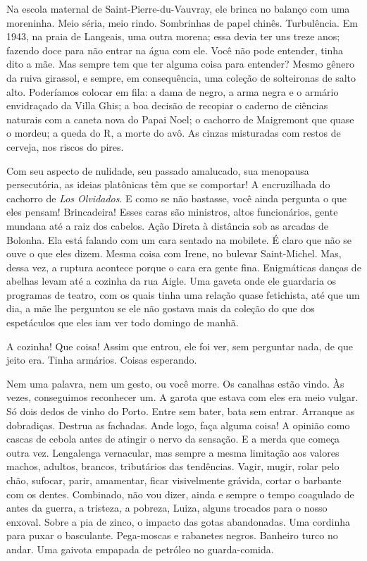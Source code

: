 Na escola maternal de Saint-Pierre-du-Vauvray, ele brinca no balanço com
uma moreninha. Meio séria, meio rindo. Sombrinhas de papel chinês.
Turbulência. Em 1943, na praia de Langeais, uma outra morena; essa devia
ter uns treze anos; fazendo doce para não entrar na água com ele. Você
não pode entender, tinha dito a mãe. Mas sempre tem que ter alguma coisa
para entender? Mesmo gênero da ruiva girassol, e sempre, em
consequência, uma coleção de solteironas de salto alto. Poderíamos
colocar em fila: a dama de negro, a arma negra e o armário envidraçado
da Villa Ghis; a boa decisão de recopiar o caderno de ciências naturais
com a caneta nova do Papai Noel; o cachorro de Maigremont que quase o
mordeu; a queda do R, a morte do avô. As cinzas misturadas com restos de
cerveja, nos riscos do pires.

Com seu aspecto de nulidade, seu passado amalucado, sua menopausa
persecutória, as ideias platônicas têm que se comportar! A encruzilhada
do cachorro de \emph{Los Olvidados}. E como se não bastasse, você ainda
pergunta o que eles pensam! Brincadeira! Esses caras são ministros,
altos funcionários, gente mundana até a raiz dos cabelos. Ação Direta à
distância sob as arcadas de Bolonha. Ela está falando com um cara
sentado na mobilete. É claro que não se ouve o que eles dizem. Mesma
coisa com Irene, no bulevar Saint-Michel. Mas, dessa vez, a ruptura
acontece porque o cara era gente fina. Enigmáticas danças de abelhas
levam até a cozinha da rua Aigle. Uma gaveta onde ele guardaria os
programas de teatro, com os quais tinha uma relação quase fetichista,
até que um dia, a mãe lhe perguntou se ele não gostava mais da coleção
do que dos espetáculos que eles iam ver todo domingo de manhã.

A cozinha! Que coisa! Assim que entrou, ele foi ver, sem perguntar nada,
de que jeito era. Tinha armários. Coisas esperando.

Nem uma palavra, nem um gesto, ou você morre. Os canalhas estão vindo.
Às vezes, conseguimos reconhecer um. A garota que estava com eles era
meio vulgar. Só dois dedos de vinho do Porto. Entre sem bater, bata sem
entrar. Arranque as dobradiças. Destrua as fachadas. Ande logo, faça
alguma coisa! A opinião como cascas de cebola antes de atingir o nervo
da sensação. E a merda que começa outra vez. Lengalenga vernacular, mas
sempre a mesma limitação aos valores machos, adultos, brancos,
tributários das tendências. Vagir, mugir, rolar pelo chão, sufocar,
parir, amamentar, ficar visivelmente grávida, cortar o barbante com os
dentes. Combinado, não vou dizer, ainda e sempre o tempo coagulado de
antes da guerra, a tristeza, a pobreza, Luiza, alguns trocados para o
nosso enxoval. Sobre a pia de zinco, o impacto das gotas abandonadas.
Uma cordinha para puxar o basculante. Pega-moscas e rabanetes negros.
Banheiro turco no andar. Uma gaivota empapada de petróleo no
guarda-comida.

